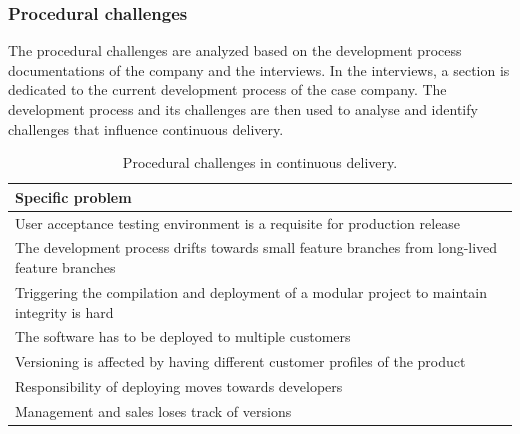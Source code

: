 \documentclass[english, grading]{tktltiki2}
\theoremstyle{definition}
\theoremstyle{remark}
\begin{document}





\subsubsection{Procedural challenges}
The procedural challenges are analyzed based on the development process documentations of the company and the interviews. In the interviews, a section is dedicated to the current development process of the case company. The development process and its challenges are then used to analyse and identify challenges that influence continuous delivery.

\begin{center}
\begin{table}[htb]
    \begin{tabular}{ | p{12cm} |}
    \hline
    \textbf{Specific problem} \\ \hline
    User acceptance testing environment is a requisite for production release \\ \hline
    The development process drifts towards small feature branches from long-lived feature branches \\ \hline
	Triggering the compilation and deployment of a modular project to maintain integrity is hard \\ \hline
	The software has to be deployed to multiple customers \\ \hline
	Versioning is affected by having different customer profiles of the product \\ \hline
	Responsibility of deploying moves towards developers \\ \hline
	Management and sales loses track of versions \\
    \hline
    \end{tabular}
    \caption{Procedural challenges in continuous delivery.}
    \end{table}
\end{center}
\end{document}
